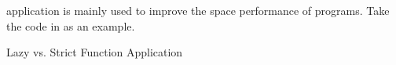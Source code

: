 application is mainly used to improve the space performance of programs.
Take the code in  as an example.

\begin{listing}[h!tbp]
\caption{Lazy vs. Strict Function Application}
\label{lst:Lazy_vs_Strict_Function_Application}
\end{listing}


